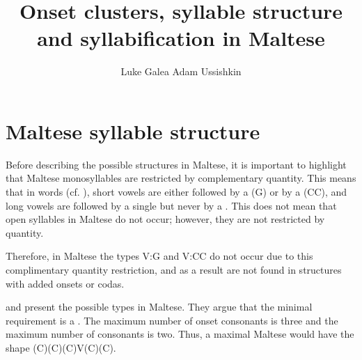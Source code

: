 \documentclass[output=paper]{langsci/langscibook}
\author{
Luke Galea\affiliation{University of Malta}\lastand
Adam Ussishkin\affiliation{University of Arizona}
}
\title{Onset clusters, syllable structure and syllabification in Maltese}
\begin{document}
\section{Maltese syllable structure} 

Before describing the possible  structures in Maltese, it is important to highlight that Maltese monosyllables are restricted by complementary quantity. This means that in  words (cf. ), short vowels are either followed by a  (G) or by a  (CC), and long vowels are followed by a single  but never by a  \citep{azzopardi2002vowel}. This does not mean that open syllables in Maltese do not occur; however, they are not restricted by quantity. 


Therefore, in Maltese the  types V:G and V:CC do not occur due to this complimentary quantity restriction, and as a result are not found in  structures with added onsets or codas.

\citet{azzopardi1981phonetics} and \citet{maltese_book} present the possible  types in Maltese. They argue that the minimal  requirement is a . The maximum number of onset consonants is three and the maximum number of  consonants is two. Thus, a maximal Maltese  would have the shape (C)(C)(C)V(C)(C). 
\end{document}
